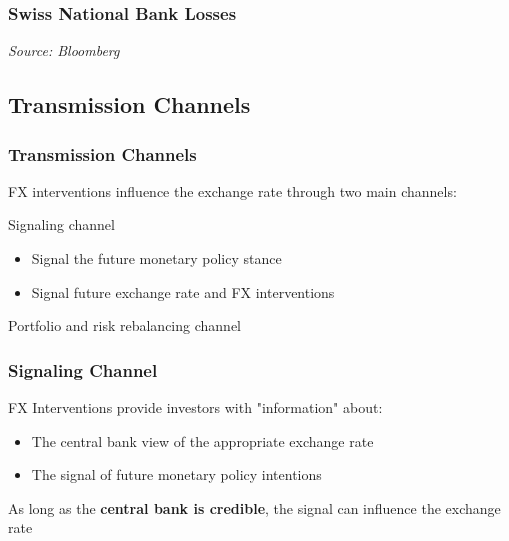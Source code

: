 \documentclass{beamer}
\newenvironment{wideitemize}{\itemize\addtolength{\itemsep}{10pt}}{\enditemize}
\newenvironment{wideenumerate}{\enumerate\addtolength{\itemsep}{10pt}}{\endenumerate}
\begin{document}
\begin{frame}
\frametitle{Swiss National Bank Losses}
\medskip
\emph{Source: Bloomberg}
\end{frame}


\subsection{Transmission Channels}
\begin{frame}
  \frametitle{Transmission Channels}

  FX interventions influence the exchange rate through two main channels:\\

  \begin{wideenumerate}
  \item Signaling channel
    \begin{itemize}
    \item Signal the future monetary policy stance
    \item Signal future exchange rate and FX interventions
    \end{itemize}
  \item Portfolio and risk rebalancing channel    
    \end{wideenumerate}    
\end{frame}


\begin{frame}
  \frametitle{Signaling Channel}
  \begin{wideitemize}
  \item FX Interventions provide investors with "information" about:
    \begin{itemize}
    \item The central bank view of the appropriate exchange rate
    \item The signal of future monetary policy intentions
    \end{itemize}
    
  \item As long as the \textbf{central bank is credible}, the signal can influence the exchange rate
  \end{wideitemize}  
\end{frame}
\end{document}
